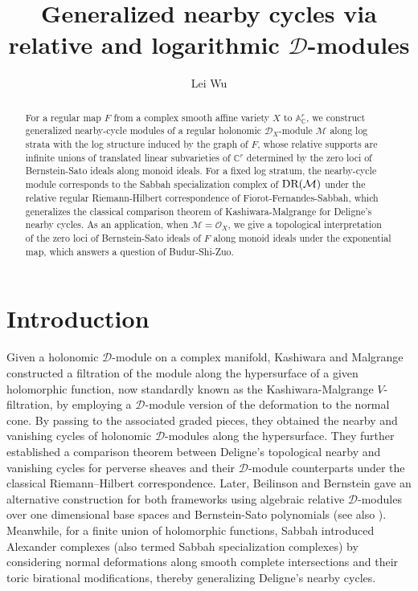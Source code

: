 \documentclass{amsart}
\title{Generalized nearby cycles via relative and logarithmic $\mathscr{D}$-modules}
\author{Lei Wu}
\theoremstyle{plain}
\numberwithin{theorem}{section}
\theoremstyle{definition}
\theoremstyle{remark}
\theoremstyle{definition}
\newcommand{\A}{\mathbb{A}}
\newcommand{\C}{\mathbb{C}} %
\newcommand{\cM}{\mathcal{M}}
\newcommand{\cO}{\mathscr{O}}
\newcommand{\shD}{\mathscr{D}}
\newcommand{\DR}{\textup{DR}}
\begin{document}
\maketitle
\begin{abstract}
    For a regular map $F$ from a complex smooth affine variety $X$ to $\A^r_\C$, we construct generalized nearby-cycle modules of a regular holonomic $\shD_X$-module $\cM$ along log strata with the log structure induced by the graph of $F$, whose relative supports are infinite unions of translated linear subvarieties of $\C^r$ determined by the zero loci of Bernstein-Sato ideals along monoid ideals. For a fixed log stratum, the nearby-cycle module corresponds to the Sabbah specialization complex of $\DR(\cM)$ under the relative regular Riemann-Hilbert correspondence of Fiorot-Fernandes-Sabbah, which generalizes the classical comparison theorem of Kashiwara-Malgrange for Deligne's nearby cycles. As an application, when $\cM=\cO_X$, we give a topological interpretation of the zero loci of Bernstein-Sato ideals of $F$ along monoid ideals under the exponential map, which answers a question of Budur-Shi-Zuo. 
\end{abstract}

\tableofcontents

\section{Introduction}
Given a holonomic $\shD$-module on a complex manifold, Kashiwara \cite{KasV} and Malgrange \cite{MalV} constructed a filtration of the module along the hypersurface of a given holomorphic function, now standardly known as the Kashiwara-Malgrange $V$-filtration, by employing a $\shD$-module version of the deformation to the normal cone. By passing to the associated graded pieces,
they obtained the nearby and vanishing cycles of holonomic $\shD$-modules along the hypersurface. They further established a comparison theorem between Deligne’s topological nearby and vanishing cycles for perverse sheaves \cite{DelV} and their $\shD$-module counterparts under the classical Riemann–Hilbert correspondence. 
Later, Beilinson and Bernstein \cite{Beiglue,BBJats} gave an alternative construction for both frameworks using algebraic relative $\shD$-modules over one dimensional base spaces and Bernstein-Sato polynomials (see also \cite{BG}). Meanwhile, for a finite union of holomorphic functions, Sabbah \cite{Sab90} introduced Alexander complexes (also termed Sabbah specialization complexes) by considering normal deformations along smooth complete intersections and their toric birational modifications, thereby generalizing Deligne's nearby cycles.  
\end{document}
